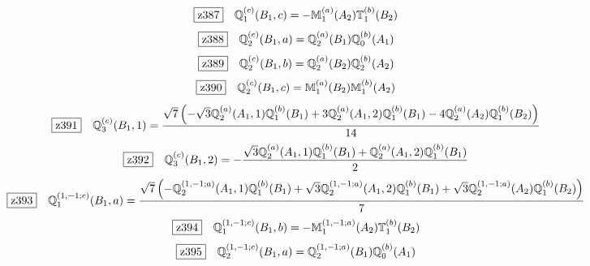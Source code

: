 \documentclass[fleqn,10pt,landscape]{jsarticle}
\begin{document}
\begin{dmath*}
\hspace*{3mm}\fbox{z387}\quad \mathbb{Q}_{1}^{(c)}(B_{1},c)=- \mathbb{M}_{1}^{(a)}(A_{2}) \mathbb{T}_{1}^{(b)}(B_{2})
\end{dmath*}
\begin{dmath*}
\hspace*{3mm}\fbox{z388}\quad \mathbb{Q}_{2}^{(c)}(B_{1},a)=\mathbb{Q}_{2}^{(a)}(B_{1}) \mathbb{Q}_{0}^{(b)}(A_{1})
\end{dmath*}
\begin{dmath*}
\hspace*{3mm}\fbox{z389}\quad \mathbb{Q}_{2}^{(c)}(B_{1},b)=\mathbb{Q}_{2}^{(a)}(B_{2}) \mathbb{Q}_{2}^{(b)}(A_{2})
\end{dmath*}
\begin{dmath*}
\hspace*{3mm}\fbox{z390}\quad \mathbb{Q}_{2}^{(c)}(B_{1},c)=\mathbb{M}_{1}^{(a)}(B_{2}) \mathbb{M}_{1}^{(b)}(A_{2})
\end{dmath*}
\begin{dmath*}
\hspace*{3mm}\fbox{z391}\quad \mathbb{Q}_{3}^{(c)}(B_{1},1)=\frac{\sqrt{7} \left(- \sqrt{3} \mathbb{Q}_{2}^{(a)}(A_{1},1) \mathbb{Q}_{1}^{(b)}(B_{1}) + 3 \mathbb{Q}_{2}^{(a)}(A_{1},2) \mathbb{Q}_{1}^{(b)}(B_{1}) - 4 \mathbb{Q}_{2}^{(a)}(A_{2}) \mathbb{Q}_{1}^{(b)}(B_{2})\right)}{14}
\end{dmath*}
\begin{dmath*}
\hspace*{3mm}\fbox{z392}\quad \mathbb{Q}_{3}^{(c)}(B_{1},2)=- \frac{\sqrt{3} \mathbb{Q}_{2}^{(a)}(A_{1},1) \mathbb{Q}_{1}^{(b)}(B_{1}) + \mathbb{Q}_{2}^{(a)}(A_{1},2) \mathbb{Q}_{1}^{(b)}(B_{1})}{2}
\end{dmath*}
\begin{dmath*}
\hspace*{3mm}\fbox{z393}\quad \mathbb{Q}_{1}^{(1,-1;c)}(B_{1},a)=\frac{\sqrt{7} \left(- \mathbb{Q}_{2}^{(1,-1;a)}(A_{1},1) \mathbb{Q}_{1}^{(b)}(B_{1}) + \sqrt{3} \mathbb{Q}_{2}^{(1,-1;a)}(A_{1},2) \mathbb{Q}_{1}^{(b)}(B_{1}) + \sqrt{3} \mathbb{Q}_{2}^{(1,-1;a)}(A_{2}) \mathbb{Q}_{1}^{(b)}(B_{2})\right)}{7}
\end{dmath*}
\begin{dmath*}
\hspace*{3mm}\fbox{z394}\quad \mathbb{Q}_{1}^{(1,-1;c)}(B_{1},b)=- \mathbb{M}_{1}^{(1,-1;a)}(A_{2}) \mathbb{T}_{1}^{(b)}(B_{2})
\end{dmath*}
\begin{dmath*}
\hspace*{3mm}\fbox{z395}\quad \mathbb{Q}_{2}^{(1,-1;c)}(B_{1},a)=\mathbb{Q}_{2}^{(1,-1;a)}(B_{1}) \mathbb{Q}_{0}^{(b)}(A_{1})
\end{dmath*}
\end{document}
